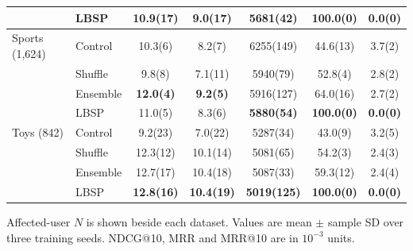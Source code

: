 \begin{table}[!htbp]
\begin{tabular*}{\textwidth}{@{\extracolsep{\fill}}llS[table-format=2.1(3)]S[table-format=2.1(3)]S[table-format=5.0(3),table-align-uncertainty=false]S[table-format=3.1(3)]S[table-format=2.1(3)]@{}}
 & LBSP & 10.9(17) & 9.0(17) & 5681(42) & \bfseries 100.0(0) & \bfseries 0.0(0)\\ %
\midrule
Sports (1,624) & Control & 10.3(6) & 8.2(7) & 6255(149) & 44.6(13) & 3.7(2)\\ %
 & Shuffle & 9.8(8) & 7.1(11) & 5940(79) & 52.8(4) & 2.8(2)\\ %
 & Ensemble & \bfseries 12.0(4) & \bfseries 9.2(5) & 5916(127) & 64.0(16) & 2.7(2)\\ %
 & LBSP & 11.0(5) & 8.3(6) & \bfseries 5880(54) & \bfseries 100.0(0) & \bfseries 0.0(0)\\ %
\midrule
Toys (842) & Control & 9.2(23) & 7.0(22) & 5287(34) & 43.0(9) & 3.2(5)\\ %
 & Shuffle & 12.3(12) & 10.1(14) & 5081(65) & 54.2(3) & 2.4(3)\\ %
 & Ensemble & 12.7(17) & 10.4(18) & 5087(33) & 59.3(12) & 2.4(4)\\ %
 & LBSP & \bfseries 12.8(16) & \bfseries 10.4(19) & \bfseries 5019(125) & \bfseries 100.0(0) & \bfseries 0.0(0)\\ %
\bottomrule
\end{tabular*}
\par\smallskip\noindent\begin{minipage}{\textwidth}\fontsize{8.5}{11}\selectfont Affected-user $N$ is shown beside each dataset. Values are mean $\pm$ sample SD over three training seeds. NDCG@10, MRR and MRR@10 are in $10^{-3}$ units.
\end{minipage}
\end{table}

